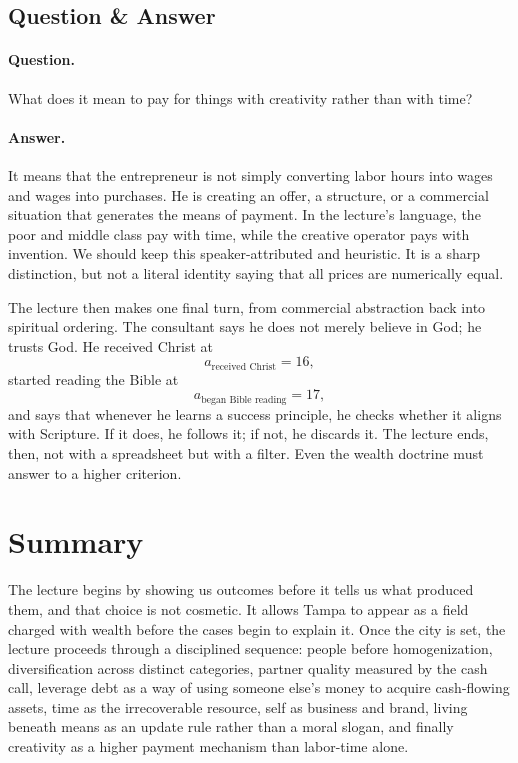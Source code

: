 \subsection{Question \& Answer}

\paragraph{Question.} What does it mean to pay for things with creativity rather than with time?

\paragraph{Answer.} It means that the entrepreneur is not simply converting labor hours into wages and wages into purchases. He is creating an offer, a structure, or a commercial situation that generates the means of payment. In the lecture's language, the poor and middle class pay with time, while the creative operator pays with invention. We should keep this speaker-attributed and heuristic. It is a sharp distinction, but not a literal identity saying that all prices are numerically equal.

The lecture then makes one final turn, from commercial abstraction back into spiritual ordering. The consultant says he does not merely believe in God; he trusts God. He received Christ at
\begin{equation}
a_{\text{received Christ}} = 16,
\end{equation}
started reading the Bible at
\begin{equation}
a_{\text{began Bible reading}} = 17,
\end{equation}
and says that whenever he learns a success principle, he checks whether it aligns with Scripture. If it does, he follows it; if not, he discards it. The lecture ends, then, not with a spreadsheet but with a filter. Even the wealth doctrine must answer to a higher criterion.

\section{Summary}

The lecture begins by showing us outcomes before it tells us what produced them, and that choice is not cosmetic. It allows Tampa to appear as a field charged with wealth before the cases begin to explain it. Once the city is set, the lecture proceeds through a disciplined sequence: people before homogenization, diversification across distinct categories, partner quality measured by the cash call, leverage debt as a way of using someone else's money to acquire cash-flowing assets, time as the irrecoverable resource, self as business and brand, living beneath means as an update rule rather than a moral slogan, and finally creativity as a higher payment mechanism than labor-time alone.

